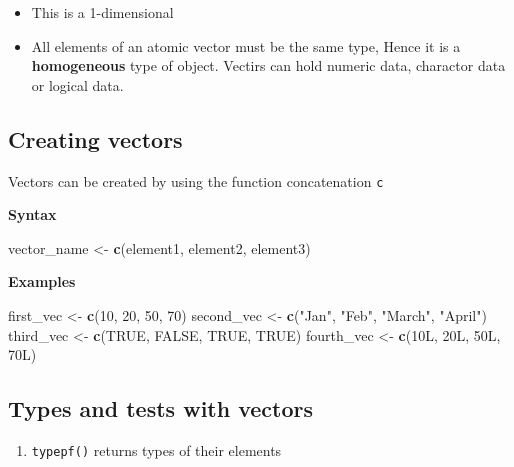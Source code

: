 \documentclass[
]{book}
\newenvironment{Shaded}{\begin{snugshade}}{\end{snugshade}}
\newcommand{\DecValTok}[1]{\textcolor[rgb]{0.00,0.00,0.81}{#1}}
\newcommand{\KeywordTok}[1]{\textcolor[rgb]{0.13,0.29,0.53}{\textbf{#1}}}
\newcommand{\NormalTok}[1]{#1}
\newcommand{\OtherTok}[1]{\textcolor[rgb]{0.56,0.35,0.01}{#1}}
\newcommand{\StringTok}[1]{\textcolor[rgb]{0.31,0.60,0.02}{#1}}
\providecommand{\tightlist}{%
  \setlength{\itemsep}{0pt}\setlength{\parskip}{0pt}}
\begin{document}
\begin{itemize}
\item
  This is a 1-dimensional
\item
  All elements of an atomic vector must be the same type, Hence it is a \textbf{homogeneous} type of object. Vectirs can hold numeric data, charactor data or logical data.
\end{itemize}

\hypertarget{creating-vectors}{%
\subsection{Creating vectors}\label{creating-vectors}}

Vectors can be created by using the function concatenation \texttt{c}

\textbf{Syntax}

\begin{Shaded}
\begin{Highlighting}[]
\NormalTok{vector_name <-}\StringTok{ }\KeywordTok{c}\NormalTok{(element1, element2, element3)}
\end{Highlighting}
\end{Shaded}

\textbf{Examples}

\begin{Shaded}
\begin{Highlighting}[]
\NormalTok{first_vec <-}\StringTok{ }\KeywordTok{c}\NormalTok{(}\DecValTok{10}\NormalTok{, }\DecValTok{20}\NormalTok{, }\DecValTok{50}\NormalTok{, }\DecValTok{70}\NormalTok{)}
\NormalTok{second_vec <-}\StringTok{ }\KeywordTok{c}\NormalTok{(}\StringTok{"Jan"}\NormalTok{, }\StringTok{"Feb"}\NormalTok{, }\StringTok{"March"}\NormalTok{, }\StringTok{"April"}\NormalTok{)}
\NormalTok{third_vec <-}\StringTok{ }\KeywordTok{c}\NormalTok{(}\OtherTok{TRUE}\NormalTok{, }\OtherTok{FALSE}\NormalTok{, }\OtherTok{TRUE}\NormalTok{, }\OtherTok{TRUE}\NormalTok{)}
\NormalTok{fourth_vec <-}\StringTok{ }\KeywordTok{c}\NormalTok{(10L, 20L, 50L, 70L)}
\end{Highlighting}
\end{Shaded}

\hypertarget{types-and-tests-with-vectors}{%
\subsection{Types and tests with vectors}\label{types-and-tests-with-vectors}}

\begin{enumerate}
\def\labelenumi{\arabic{enumi}.}
\tightlist
\item
  \texttt{typepf()} returns types of their elements
\end{enumerate}
\end{document}
